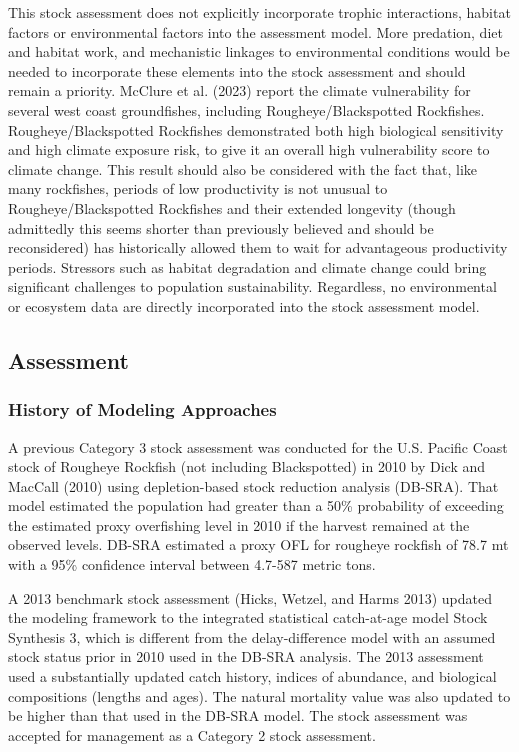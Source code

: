\documentclass[
]{scrartcl}
\begin{document}
This stock assessment does not explicitly incorporate trophic
interactions, habitat factors or environmental factors into the
assessment model. More predation, diet and habitat work, and mechanistic
linkages to environmental conditions would be needed to incorporate
these elements into the stock assessment and should remain a priority.
McClure et al. (2023) report the climate vulnerability for several west
coast groundfishes, including Rougheye/Blackspotted Rockfishes.
Rougheye/Blackspotted Rockfishes demonstrated both high biological
sensitivity and high climate exposure risk, to give it an overall high
vulnerability score to climate change. This result should also be
considered with the fact that, like many rockfishes, periods of low
productivity is not unusual to Rougheye/Blackspotted Rockfishes and
their extended longevity (though admittedly this seems shorter than
previously believed and should be reconsidered) has historically allowed
them to wait for advantageous productivity periods. Stressors such as
habitat degradation and climate change could bring significant
challenges to population sustainability. Regardless, no environmental or
ecosystem data are directly incorporated into the stock assessment
model.

\newpage{}

\subsection{Assessment}\label{assessment}

\subsubsection{History of Modeling
Approaches}\label{history-of-modeling-approaches}

A previous Category 3 stock assessment was conducted for the U.S.
Pacific Coast stock of Rougheye Rockfish (not including Blackspotted) in
2010 by Dick and MacCall (2010) using depletion-based stock reduction
analysis (DB-SRA). That model estimated the population had greater than
a 50\% probability of exceeding the estimated proxy overfishing level in
2010 if the harvest remained at the observed levels. DB-SRA estimated a
proxy OFL for rougheye rockfish of 78.7 mt with a 95\% confidence
interval between 4.7-587 metric tons.

A 2013 benchmark stock assessment (Hicks, Wetzel, and Harms 2013)
updated the modeling framework to the integrated statistical
catch-at-age model Stock Synthesis 3, which is different from the
delay-difference model with an assumed stock status prior in 2010 used
in the DB-SRA analysis. The 2013 assessment used a substantially updated
catch history, indices of abundance, and biological compositions
(lengths and ages). The natural mortality value was also updated to be
higher than that used in the DB-SRA model. The stock assessment was
accepted for management as a Category 2 stock assessment.
\end{document}
